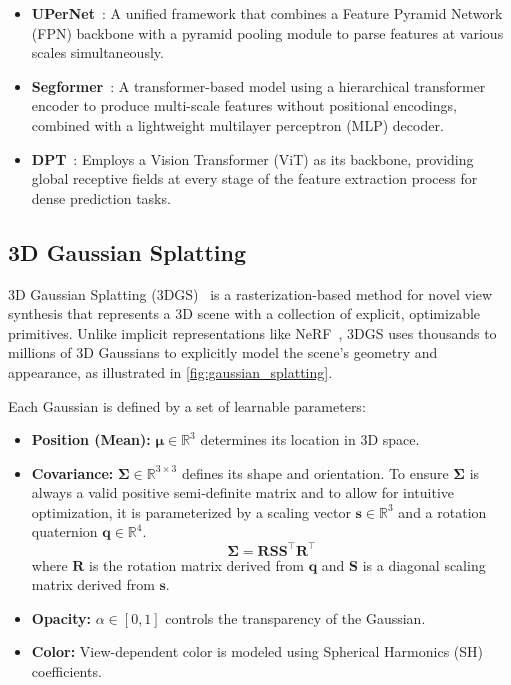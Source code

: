 \begin{itemize}
	\item \textbf{UPerNet}~\cite{xiao_unified_2018}: A unified framework that combines a Feature Pyramid Network (FPN) backbone with a pyramid pooling module to parse features at various scales simultaneously.

	\item \textbf{Segformer}~\cite{xie_segformer_2021}: A transformer-based model using a hierarchical transformer encoder to produce multi-scale features without positional encodings, combined with a lightweight multilayer perceptron (MLP) decoder.

	\item \textbf{DPT}~\cite{ranftl_vision_2021}: Employs a Vision Transformer (ViT) as its backbone, providing global receptive fields at every stage of the feature extraction process for dense prediction tasks.
\end{itemize}

\subsection{3D Gaussian Splatting}
3D Gaussian Splatting (3DGS)~\cite{kerbl_3d_2023} is a rasterization-based method for novel view synthesis that represents a 3D scene with a collection of explicit, optimizable primitives. Unlike implicit representations like NeRF~\cite{mildenhall_nerf_2021}, 3DGS uses thousands to millions of 3D Gaussians to explicitly model the scene's geometry and appearance, as illustrated in \cref{fig:gaussian_splatting}.

Each Gaussian is defined by a set of learnable parameters:
\begin{itemize}
	\item \textbf{Position (Mean):} $\boldsymbol{\mu} \in \mathbb{R}^3$ determines its location in 3D space.
	\item \textbf{Covariance:} $\boldsymbol{\Sigma} \in \mathbb{R}^{3 \times 3}$ defines its shape and orientation. To ensure $\boldsymbol{\Sigma}$ is always a valid positive semi-definite matrix and to allow for intuitive optimization, it is parameterized by a scaling vector $\mathbf{s} \in \mathbb{R}^3$ and a rotation quaternion $\mathbf{q} \in \mathbb{R}^4$.
	      \begin{equation}
		      \boldsymbol{\Sigma} = \mathbf{R} \mathbf{S} \mathbf{S}^\top \mathbf{R}^\top
	      \end{equation}
	      where $\mathbf{R}$ is the rotation matrix derived from $\mathbf{q}$ and $\mathbf{S}$ is a diagonal scaling matrix derived from $\mathbf{s}$.
	\item \textbf{Opacity:} $\alpha \in [0, 1]$ controls the transparency of the Gaussian.
	\item \textbf{Color:} View-dependent color is modeled using Spherical Harmonics (SH) coefficients.
\end{itemize}

